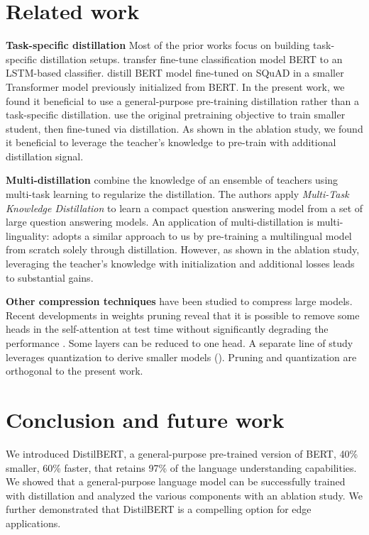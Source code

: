 \documentclass{article}
\begin{document}
\section{Related work}

\textbf{Task-specific distillation} Most of the prior works focus on building task-specific distillation setups. \citet{Tang2019DistillingTK} transfer fine-tune classification model BERT to an LSTM-based classifier. \citet{Chatterjee2019MakingNM} distill BERT model fine-tuned on SQuAD in a smaller Transformer model previously initialized from BERT. In the present work, we found it beneficial to use a general-purpose pre-training distillation rather than a task-specific distillation. \citet{Turc2019WellReadSL} use the original pretraining objective to train smaller student, then fine-tuned via distillation. As shown in the ablation study, we found it beneficial to leverage the teacher's knowledge to pre-train with additional distillation signal.

\textbf{Multi-distillation} \citet{Yang2019ModelCW} combine the knowledge of an ensemble of teachers using multi-task learning to regularize the distillation. The authors apply \textit{Multi-Task Knowledge Distillation} to learn a compact question answering model from a set of large question answering models. An application of multi-distillation is multi-linguality: \citet{Tsai2019SmallAP} adopts a similar approach to us by pre-training a multilingual model from scratch solely through distillation. However, as shown in the ablation study, leveraging the teacher's knowledge with initialization and additional losses leads to substantial gains.

\textbf{Other compression techniques} have been studied to compress large models. Recent developments in weights pruning reveal that it is possible to remove some heads in the self-attention at test time without significantly degrading the performance \citet{Michel2019AreSH}. Some layers can be reduced to one head. A separate line of study leverages quantization to derive smaller models (\citet{Gupta2015DeepLW}). Pruning and quantization are orthogonal to the present work.

\section{Conclusion and future work}

We introduced DistilBERT, a general-purpose pre-trained version of BERT, 40\% smaller, 60\% faster, that retains 97\% of the language understanding capabilities. We showed that a general-purpose language model can be successfully trained with distillation and analyzed the various components with an ablation study. We further demonstrated that DistilBERT is a compelling option for edge applications.


\fontsize{9.0pt}{9.0pt} \selectfont
 

\end{document}
